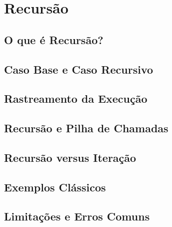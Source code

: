 \chapter{Recursão}

\section{O que é Recursão?}

\section{Caso Base e Caso Recursivo}

\section{Rastreamento da Execução}

\section{Recursão e Pilha de Chamadas}

\section{Recursão versus Iteração}

\section{Exemplos Clássicos}

\section{Limitações e Erros Comuns}
